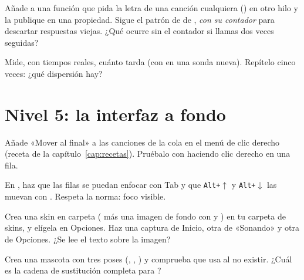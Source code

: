 \begin{ejercicio}
Añade a  una función que pida la letra de una canción cualquiera
() en otro hilo y la publique en una propiedad. Sigue el patrón de
 de , \emph{con su contador} para descartar respuestas viejas.
¿Qué ocurre sin el contador si llamas dos veces seguidas?
\end{ejercicio}

\begin{ejercicio}
Mide, con tiempos reales, cuánto tarda  (con
 en una sonda nueva). Repítelo cinco veces: ¿qué dispersión hay?
\end{ejercicio}

\section{Nivel 5: la interfaz a fondo}

\begin{ejercicio}
Añade «Mover al final» a las canciones de la cola en el menú de clic derecho (receta de
la capítulo~\ref{cap:recetas}). Pruébalo con  haciendo clic
derecho en una fila.
\end{ejercicio}

\begin{ejercicio}
En , haz que las filas se puedan enfocar con Tab y que \texttt{Alt+$\uparrow$} y
\texttt{Alt+$\downarrow$} las muevan con . Respeta la norma: foco visible.
\end{ejercicio}

\begin{ejercicio}
Crea una skin en carpeta ( más una imagen de fondo con  y
) en tu carpeta de skins, y elígela en Opciones. Haz una captura de Inicio, otra de
«Sonando» y otra de Opciones. ¿Se lee el texto sobre la imagen?
\end{ejercicio}

\begin{ejercicio}
Crea una mascota con tres poses (, , ) y comprueba que
 usa  al no existir. ¿Cuál es la cadena de sustitución completa para
?
\end{ejercicio}

